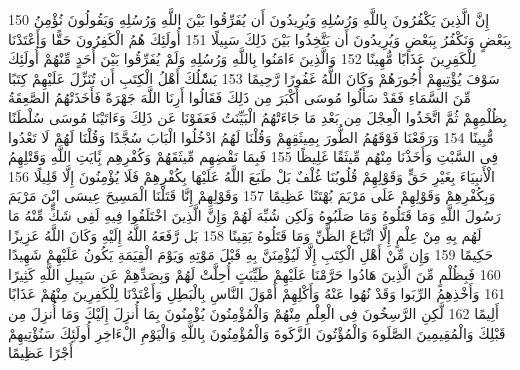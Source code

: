 {\tiny\colorbox{cl_aya}{150}} إِنَّ الَّذِينَ يَكْفُرُونَ بِاللَّهِ وَرُسُلِهِ وَيُرِيدُونَ أَن يُفَرِّقُوا بَيْنَ اللَّهِ وَرُسُلِهِ وَيَقُولُونَ نُؤْمِنُ بِبَعْضٍ وَنَكْفُرُ بِبَعْضٍ وَيُرِيدُونَ أَن يَتَّخِذُوا بَيْنَ ذَلِكَ سَبِيلًا
{\tiny\colorbox{cl_aya}{151}} أُولَئِكَ هُمُ الْكَفِرُونَ حَقًّا وَأَعْتَدْنَا لِلْكَفِرِينَ عَذَابًا مُّهِينًا
{\tiny\colorbox{cl_aya}{152}} وَالَّذِينَ ءَامَنُوا بِاللَّهِ وَرُسُلِهِ وَلَمْ يُفَرِّقُوا بَيْنَ أَحَدٍ مِّنْهُمْ أُولَئِكَ سَوْفَ يُؤْتِيهِمْ أُجُورَهُمْ وَكَانَ اللَّهُ غَفُورًا رَّحِيمًا
{\tiny\colorbox{cl_aya}{153}} يَسَْٔلُكَ أَهْلُ الْكِتَبِ أَن تُنَزِّلَ عَلَيْهِمْ كِتَبًا مِّنَ السَّمَاءِ فَقَدْ سَأَلُوا مُوسَى أَكْبَرَ مِن ذَلِكَ فَقَالُوا أَرِنَا اللَّهَ جَهْرَةً فَأَخَذَتْهُمُ الصَّعِقَةُ بِظُلْمِهِمْ ثُمَّ اتَّخَذُوا الْعِجْلَ مِن بَعْدِ مَا جَاءَتْهُمُ الْبَيِّنَتُ فَعَفَوْنَا عَن ذَلِكَ وَءَاتَيْنَا مُوسَى سُلْطَنًا مُّبِينًا
{\tiny\colorbox{cl_aya}{154}} وَرَفَعْنَا فَوْقَهُمُ الطُّورَ بِمِيثَقِهِمْ وَقُلْنَا لَهُمُ ادْخُلُوا الْبَابَ سُجَّدًا وَقُلْنَا لَهُمْ لَا تَعْدُوا فِى السَّبْتِ وَأَخَذْنَا مِنْهُم مِّيثَقًا غَلِيظًا
{\tiny\colorbox{cl_aya}{155}} فَبِمَا نَقْضِهِم مِّيثَقَهُمْ وَكُفْرِهِم بَِٔايَتِ اللَّهِ وَقَتْلِهِمُ الْأَنبِيَاءَ بِغَيْرِ حَقٍّ وَقَوْلِهِمْ قُلُوبُنَا غُلْفٌ بَلْ طَبَعَ اللَّهُ عَلَيْهَا بِكُفْرِهِمْ فَلَا يُؤْمِنُونَ إِلَّا قَلِيلًا
{\tiny\colorbox{cl_aya}{156}} وَبِكُفْرِهِمْ وَقَوْلِهِمْ عَلَى مَرْيَمَ بُهْتَنًا عَظِيمًا
{\tiny\colorbox{cl_aya}{157}} وَقَوْلِهِمْ إِنَّا قَتَلْنَا الْمَسِيحَ عِيسَى ابْنَ مَرْيَمَ رَسُولَ اللَّهِ وَمَا قَتَلُوهُ وَمَا صَلَبُوهُ وَلَكِن شُبِّهَ لَهُمْ وَإِنَّ الَّذِينَ اخْتَلَفُوا فِيهِ لَفِى شَكٍّ مِّنْهُ مَا لَهُم بِهِ مِنْ عِلْمٍ إِلَّا اتِّبَاعَ الظَّنِّ وَمَا قَتَلُوهُ يَقِينًا
{\tiny\colorbox{cl_aya}{158}} بَل رَّفَعَهُ اللَّهُ إِلَيْهِ وَكَانَ اللَّهُ عَزِيزًا حَكِيمًا
{\tiny\colorbox{cl_aya}{159}} وَإِن مِّنْ أَهْلِ الْكِتَبِ إِلَّا لَيُؤْمِنَنَّ بِهِ قَبْلَ مَوْتِهِ وَيَوْمَ الْقِيَمَةِ يَكُونُ عَلَيْهِمْ شَهِيدًا
{\tiny\colorbox{cl_aya}{160}} فَبِظُلْمٍ مِّنَ الَّذِينَ هَادُوا حَرَّمْنَا عَلَيْهِمْ طَيِّبَتٍ أُحِلَّتْ لَهُمْ وَبِصَدِّهِمْ عَن سَبِيلِ اللَّهِ كَثِيرًا
{\tiny\colorbox{cl_aya}{161}} وَأَخْذِهِمُ الرِّبَوا وَقَدْ نُهُوا عَنْهُ وَأَكْلِهِمْ أَمْوَلَ النَّاسِ بِالْبَطِلِ وَأَعْتَدْنَا لِلْكَفِرِينَ مِنْهُمْ عَذَابًا أَلِيمًا
{\tiny\colorbox{cl_aya}{162}} لَّكِنِ الرَّسِخُونَ فِى الْعِلْمِ مِنْهُمْ وَالْمُؤْمِنُونَ يُؤْمِنُونَ بِمَا أُنزِلَ إِلَيْكَ وَمَا أُنزِلَ مِن قَبْلِكَ وَالْمُقِيمِينَ الصَّلَوةَ وَالْمُؤْتُونَ الزَّكَوةَ وَالْمُؤْمِنُونَ بِاللَّهِ وَالْيَوْمِ الْءَاخِرِ أُولَئِكَ سَنُؤْتِيهِمْ أَجْرًا عَظِيمًا
